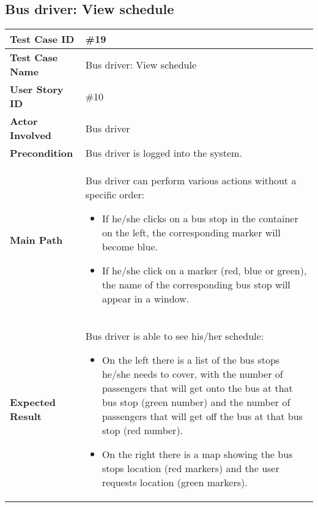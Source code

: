 \subsection{Bus driver: View schedule}
\begin{center}
	\begin{tabular} { | m{3.5cm} | m{9.5cm} | }
		\hline
		\textbf{Test Case ID} & \#19\\
		\hline
		\textbf{Test Case Name} & Bus driver: View schedule\\
		\hline
		\textbf{User Story ID} & \#10 \\
		\hline
		\textbf{Actor Involved} & Bus driver\\
		\hline
		\textbf{Precondition} & Bus driver is logged into the system.\\
		\hline
		\textbf{Main Path} & 
		Bus driver can perform various actions without a specific order:
			\begin{itemize}
				\item If he/she clicks on a bus stop in the container on the left, the corresponding marker will become blue.
				\item If he/she click on a marker (red, blue or green), the name of the corresponding bus stop will appear in a window.
			\end{itemize}\\
		\hline
		\textbf{Expected Result} & Bus driver is able to see his/her schedule: 
		\begin{itemize}
			\item On the left there is a list of the bus stops he/she needs to cover, with the number of passengers that will get onto the bus at that bus stop (green number) and the number of passengers that will get off the bus at that bus stop (red number).
			\item On the right there is a map showing the bus stops location (red markers) and the user requests location (green markers).
		\end{itemize}\\
		\hline
	\end{tabular}
\end{center}